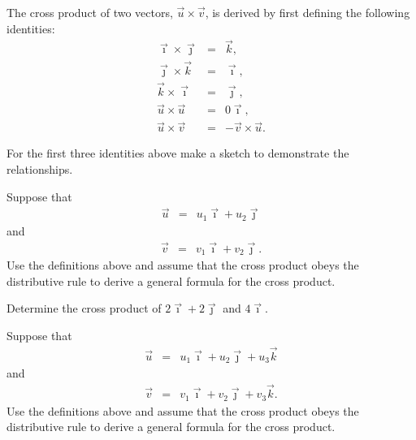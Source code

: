\begin{problem}
\item The cross product of two vectors, $\vec{u}\times\vec{v}$, is
  derived by first defining  the following identities:
  \begin{eqnarray*}
    \vec{\imath} \times \vec{\jmath} & = & \vec{k}, \\
    \vec{\jmath} \times \vec{k} & = & \vec{\imath}, \\
    \vec{k} \times \vec{\imath} & = & \vec{\jmath}, \\
    \vec{u} \times \vec{u} & = & 0 \vec{\imath}, \\
    \vec{u} \times \vec{v} & = & - \vec{v} \times \vec{u}.
  \end{eqnarray*}
  \begin{subproblem}
  \item For the first three identities above make a sketch to
    demonstrate the relationships.  
    \vfill

    \clearpage

  \item Suppose that
    \begin{eqnarray*}
      \vec{u} & = & u_1 \vec{\imath} + u_2 \vec{\jmath}
    \end{eqnarray*}
    and
    \begin{eqnarray*}
      \vec{v} & = & v_1 \vec{\imath} + v_2 \vec{\jmath}.
    \end{eqnarray*}
    Use the definitions above and assume that the cross product obeys
    the distributive rule to derive a general formula for the cross
    product. 
    \vfill
    \vfill

  \item Determine the cross product of $2 \vec{\imath} + 2\vec{\jmath}$ and $4 \vec{\imath}$.
    \vfill

    \clearpage

  \item Suppose that
    \begin{eqnarray*}
      \vec{u} & = & u_1 \vec{\imath} + u_2 \vec{\jmath} + u_3 \vec{k}
    \end{eqnarray*}
    and
    \begin{eqnarray*}
      \vec{v} & = & v_1 \vec{\imath} + v_2 \vec{\jmath} + v_3 \vec{k}.
    \end{eqnarray*}
    Use the definitions above and assume that the cross product obeys
    the distributive rule to derive a general formula for the cross product.
    \vfill

  \end{subproblem}
\end{problem}


